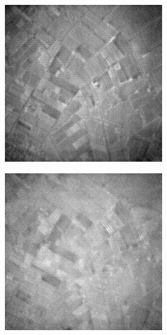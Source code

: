 \documentclass[10pt,twocolumn,letterpaper]{article}
\begin{document}
\begin{figure}[!ht]
\begin{subfigure}[b]{0.19\textwidth}
  \end{subfigure}
  \hfill
  \begin{subfigure}[b]{0.19\textwidth}
      \centering
      \includegraphics[width=\textwidth]{../figs/outputs/cut/50.png}
  \end{subfigure}
  \hfill
  \begin{subfigure}[b]{0.19\textwidth}
      \centering
      \includegraphics[width=\textwidth]{../figs/outputs/petit/50.png}

\end{subfigure}
\end{figure}
\end{document}
